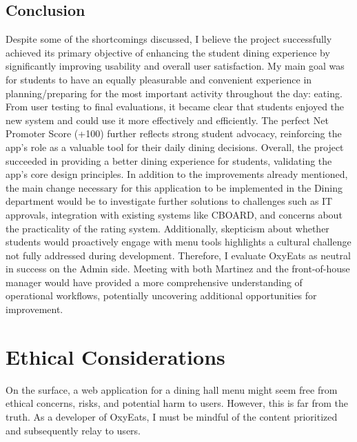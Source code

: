 \documentclass[10pt,twocolumn]{article}
\begin{document}
\subsection{Conclusion}
Despite some of the shortcomings discussed, I believe the project successfully achieved its primary objective of enhancing the student dining experience by significantly improving usability and overall user satisfaction. My main goal was for students to have an equally pleasurable and convenient experience in planning/preparing for the most important activity throughout the day: eating. From user testing to final evaluations, it became clear that students enjoyed the new system and could use it more effectively and efficiently. The perfect Net Promoter Score (+100) further reflects strong student advocacy, reinforcing the app’s role as a valuable tool for their daily dining decisions. Overall, the project succeeded in providing a better dining experience for students, validating the app’s core design principles. In addition to the improvements already mentioned, the main change necessary for this application to be implemented in the Dining department would be to investigate further solutions to challenges such as IT approvals, integration with existing systems like CBOARD, and concerns about the practicality of the rating system. Additionally, skepticism about whether students would proactively engage with menu tools highlights a cultural challenge not fully addressed during development. Therefore, I evaluate OxyEats as neutral in success on the Admin side. Meeting with both Martinez and the front-of-house manager would have provided a more comprehensive understanding of operational workflows, potentially uncovering additional opportunities for improvement.  

\section{Ethical Considerations}
On the surface, a web application for a dining hall menu might seem free from ethical concerns, risks, and potential harm to users. However, this is far from the truth. As a developer of OxyEats, I must be mindful of the content prioritized and subsequently relay to users.
\end{document}
